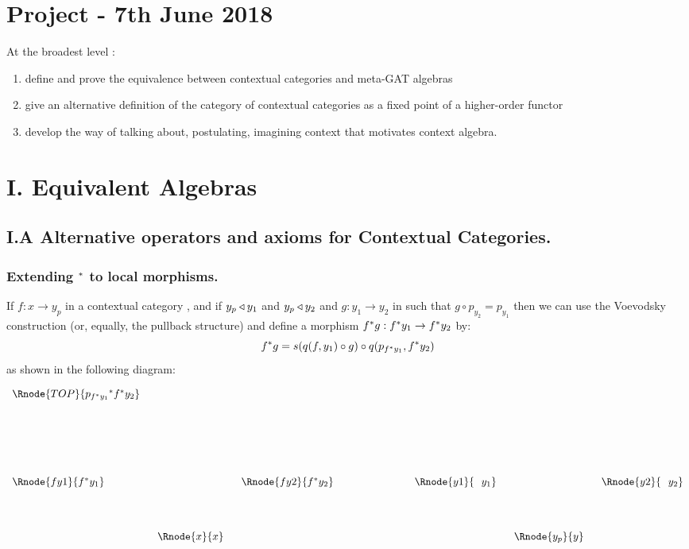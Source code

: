 \documentclass[10pt,a4paper]{scrartcl}
\begin{document}
\section{Project - 7th June 2018 }
At the broadest level :
\begin{enumerate}[I]
	\item define and prove the equivalence between contextual categories and meta-GAT algebras
	\item give an alternative definition of the category of contextual categories as a fixed point of a higher-order functor
	\item develop the way of talking about, postulating, imagining context that motivates context algebra. 
\end{enumerate}
\section{I. Equivalent Algebras}
\subsection{I.A Alternative operators and axioms for Contextual Categories.}
\subsubsection{Extending $^*$ to local morphisms.}
 
If $f:x \rightarrow y_p$ in a contextual category , and if $y_p \triangleleft y_1$ and $y_p \triangleleft y_2$ and 
$g: y_1 \rightarrow y_2$ in  such that $g \circ p_{y_2}=p_{y_1}$ then we can use the Voevodsky construction (or, equally, the pullback structure)
and define a morphism $f^* g:f ^* y_1 \rightarrow f ^* y_2$ by:
\begin{equation}
f ^* g = s(q(f,y_1) \circ g) \circ q(p_{f ^* y_1},f ^* y_2)
\end{equation}
as shown in the following diagram:

\begin{center}
\begin{displaymath}
\begin{array}{lccp{2.0cm}ccc}
\Rnode{TOP}{{p_{f \sub y_1}}\sub {f \sub y_2}} &   &  &&  &       & \\ [2.5cm]

 \Rnode{fy1}{f \sub y_1} &     & \Rnode{fy2}{f \sub y_2} && \Rnode{y1}{\ \ y_1} &       & \Rnode{y2}{\ \ y_2}\\ [1.4cm]
                         &\ \ \Rnode{x}{x}\ \ &                  &&                 &\ \ \Rnode{y_p}{y}\ \ &            
\end{array}
\end{displaymath}
\end{center}
\end{document}
